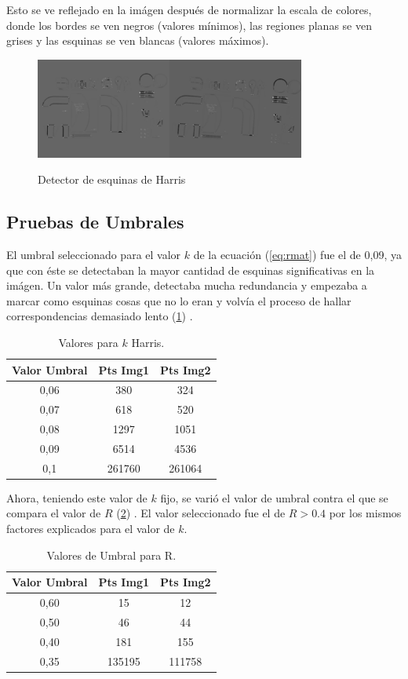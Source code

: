 \documentclass{IEEEtran}
\begin{document}
Esto se ve reflejado en la imágen después de normalizar la escala
de colores, donde los bordes se ven negros (valores mínimos),
las regiones planas se ven grises y las esquinas se ven blancas (valores máximos).

\begin{figure}[H]
\caption{Detector de esquinas de Harris}
\centering
\includegraphics[width=8.9cm,natwidth=1200,natheight=450]{figs/harris.png}
\label{fig:harris}
\end{figure}

\subsection{Pruebas de Umbrales}

El umbral seleccionado para el valor $k$ de la ecuación (\ref{eq:rmat}) 
fue el de 0,09, ya que con éste se detectaban la mayor cantidad de esquinas significativas
en la imágen. Un valor más grande, detectaba mucha redundancia y empezaba a 
marcar como esquinas cosas que no lo eran y volvía el proceso de hallar correspondencias
demasiado lento (\ref{tb:kharris}) .

\begin{table}[H]
\centering
\begin{tabular}{*3c}
\toprule
Valor Umbral & Pts Img1 & Pts Img2\\
\midrule
0,06 & 380 & 324\\
0,07 & 618 & 520\\
0,08 & 1297 & 1051\\
0,09 & 6514 & 4536\\
0,1 & 261760 & 261064 \\
\bottomrule
\end{tabular}
\caption{Valores para $k$  Harris.}
\label{tb:kharris}
\end{table} 

Ahora, teniendo este valor de $k$ fijo, se varió el 
valor de umbral contra el que se compara el valor de $R$
(\ref{tb:rharris}) .
El valor seleccionado fue el de $R>0.4$ por los
mismos factores explicados para el valor de $k$.

\begin{table}[H]
\centering
\begin{tabular}{*3c}
\toprule
Valor Umbral & Pts Img1 & Pts Img2\\
\midrule
0,60 & 15 & 12\\
0,50 & 46 & 44\\
0,40 & 181 & 155\\
0,35 & 135195 & 111758\\
\bottomrule
\end{tabular}
\caption{Valores de Umbral para R.}
\label{tb:rharris}
\end{table} 
\end{document}
